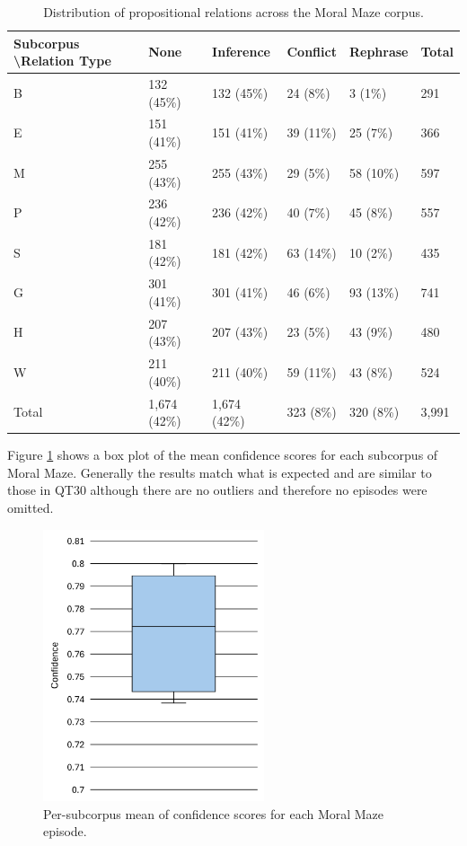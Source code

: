 \documentclass[twocolumn,twoside]{article}
\begin{document}
\begin{table}[t]
\centering
\caption{Distribution of propositional relations across the Moral Maze corpus. \label{tbl:moral-rel-no}}
\begin{tabular}{|l|llll|l|}
\hline
Subcorpus \textbackslash  Relation Type & None         & Inference    & Conflict  & Rephrase  & Total \\ \hline
B             & 132 (45\%)   & 132 (45\%)   & 24 (8\%)  & 3 (1\%)   & 291   \\
E             & 151 (41\%)   & 151 (41\%)   & 39 (11\%) & 25 (7\%)  & 366   \\
M             & 255 (43\%)   & 255 (43\%)   & 29 (5\%)  & 58 (10\%) & 597   \\
P             & 236 (42\%)   & 236 (42\%)   & 40 (7\%)  & 45 (8\%)  & 557   \\
S             & 181 (42\%)   & 181 (42\%)   & 63 (14\%) & 10 (2\%)  & 435   \\
G             & 301 (41\%)   & 301 (41\%)   & 46 (6\%)  & 93 (13\%) & 741   \\
H             & 207 (43\%)   & 207 (43\%)   & 23 (5\%)  & 43 (9\%)  & 480   \\
W             & 211 (40\%)   & 211 (40\%)   & 59 (11\%)  & 43 (8\%)  & 524   \\ \hline
Total         & 1,674 (42\%) & 1,674 (42\%) & 323 (8\%) & 320 (8\%) & 3,991 \\ \hline
\end{tabular}
\end{table}

Figure \ref{fig:mm-confidence-box} shows a box plot of the mean
confidence scores for each subcorpus of Moral Maze. Generally the
results match what is expected and are similar to those in QT30 although
there are no outliers and therefore no episodes were omitted.

\begin{figure}[h]
\centering
\includegraphics[height=8cm]{mm-confidence-box}
\caption{Per-subcorpus mean of confidence scores for each Moral Maze episode. \label{fig:mm-confidence-box}}
\end{figure}
\end{document}
